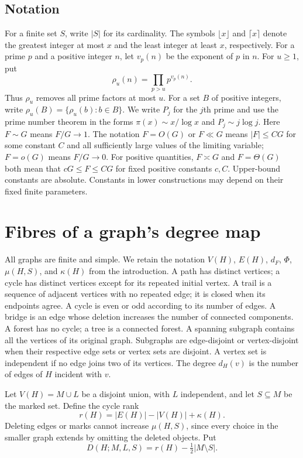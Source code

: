 \documentclass[11pt]{article}
\numberwithin{equation}{section}
\theoremstyle{remark}
\begin{document}
\subsection*{Notation}
For a finite set $S$, write $|S|$ for its cardinality. The symbols $\lfloor x\rfloor$ and $\lceil x\rceil$ denote the greatest integer at most $x$ and the least integer at least $x$, respectively. For a prime $p$ and a positive integer $n$, let $v_p(n)$ be the exponent of $p$ in $n$. For $u\ge1$, put
\[
\rho_u(n)=\prod_{p>u}p^{v_p(n)}.
\]
Thus $\rho_u$ removes all prime factors at most $u$. For a set $B$ of positive integers, write $\rho_u(B)=\{\rho_u(b):b\in B\}$. We write $P_j$ for the $j$th prime and use the prime number theorem in the forms $\pi(x)\sim x/\log x$ and $P_j\sim j\log j$. Here $F\sim G$ means $F/G\to1$. The notation $F=O(G)$ or $F\ll G$ means $|F|\le CG$ for some constant $C$ and all sufficiently large values of the limiting variable; $F=o(G)$ means $F/G\to0$. For positive quantities, $F\asymp G$ and $F=\Theta(G)$ both mean that $cG\le F\le CG$ for fixed positive constants $c,C$. Upper-bound constants are absolute. Constants in lower constructions may depend on their fixed finite parameters.

\section{Fibres of a graph's degree map}\label{sec:graph}
All graphs are finite and simple. We retain the notation $V(H)$, $E(H)$, $d_F$, $\Phi$, $\mu(H,S)$, and $\kappa(H)$ from the introduction. A path has distinct vertices; a cycle has distinct vertices except for its repeated initial vertex. A trail is a sequence of adjacent vertices with no repeated edge; it is closed when its endpoints agree. A cycle is even or odd according to its number of edges. A bridge is an edge whose deletion increases the number of connected components. A forest has no cycle; a tree is a connected forest. A spanning subgraph contains all the vertices of its original graph. Subgraphs are edge-disjoint or vertex-disjoint when their respective edge sets or vertex sets are disjoint. A vertex set is independent if no edge joins two of its vertices. The degree $d_H(v)$ is the number of edges of $H$ incident with $v$.

Let $V(H)=M\cup L$ be a disjoint union, with $L$ independent, and let $S\subseteq M$ be the marked set. Define the cycle rank
\[
r(H)=|E(H)|-|V(H)|+\kappa(H).
\]
Deleting edges or marks cannot increase $\mu(H,S)$, since every choice in the smaller graph extends by omitting the deleted objects. Put
\[
D(H;M,L,S)=r(H)-\tfrac12|M\setminus S|.
\]
\end{document}
